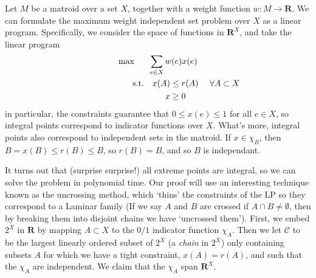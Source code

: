 Let $M$ be a matroid over a set $X$, together with a weight function $w: M \to \mathbf{R}$. We can formulate the maximum weight independent set problem over $X$ as a linear program. Specifically, we consider the space of functions in $\mathbf{R}^X$, and take the linear program
%
\begin{gather*}
\max \quad\ \ \sum_{e \in X} w(e) x(e) \\
\begin{aligned}
\ \ \ \ \ \ \ \ \ \ \ \ \ \ \ \ \ \ \ \ \textup{s.t.} \quad x(A) &\leq r(A)\ \ \ \ \forall A \subset X \\
                  x &\geq 0
\end{aligned}
\end{gather*}
%
in particular, the constraints guarantee that $0 \leq x(e) \leq 1$ for all $e \in X$, so integral points correspond to indicator functions over $X$. What's more, integral points also correspond to independent sets in the matroid. If $x \in \chi_B$, then $B = x(B) \leq r(B) \leq B$, so $r(B) = B$, and so $B$ is independant.

It turns out that (surprise surprise!) all extreme points are integral, so we can solve the problem in polynomial time. Our proof will use an interesting technique known as the uncrossing method, which `thins' the constraints of the LP so they correspond to a Laminar family (If we say $A$ and $B$ are crossed if $A \cap B \neq \emptyset$, then by breaking them into disjoint chains we have `uncrossed them'). First, we embed $2^X$ in $\mathbf{R}$ by mapping $A \subset X$ to the $0/1$ indicator function $\chi_A$. Then we let $\mathcal{C}$ to be the largest linearly ordered subset of $2^X$ (a {\it chain} in $2^X$) only containing subsets $A$ for which we have a tight constraint, $x(A) = r(A)$, and such that the $\chi_A$ are independent. We claim that the $\chi_A$ span $\mathbf{R}^X$.

